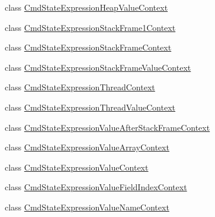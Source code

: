 \begin{DoxyCompactItemize}
\item 
class \hyperlink{classgov_1_1nasa_1_1jpf_1_1inspector_1_1server_1_1expression_1_1parser_1_1_expression_grammar_pa975e8909fcf76b653e93728b8bf729a1}{Cmd\+State\+Expression\+Heap\+Value\+Context}
\item 
class \hyperlink{classgov_1_1nasa_1_1jpf_1_1inspector_1_1server_1_1expression_1_1parser_1_1_expression_grammar_pabec1adacda521b9e6ed9ea64caf537b4}{Cmd\+State\+Expression\+Stack\+Frame1\+Context}
\item 
class \hyperlink{classgov_1_1nasa_1_1jpf_1_1inspector_1_1server_1_1expression_1_1parser_1_1_expression_grammar_pa1661807291671005dea18d81e1943036}{Cmd\+State\+Expression\+Stack\+Frame\+Context}
\item 
class \hyperlink{classgov_1_1nasa_1_1jpf_1_1inspector_1_1server_1_1expression_1_1parser_1_1_expression_grammar_pa27eac9bb10e329b6f1427633e5ce16ca}{Cmd\+State\+Expression\+Stack\+Frame\+Value\+Context}
\item 
class \hyperlink{classgov_1_1nasa_1_1jpf_1_1inspector_1_1server_1_1expression_1_1parser_1_1_expression_grammar_paf34f6c6cf6d3cef851c12971caa03ed5}{Cmd\+State\+Expression\+Thread\+Context}
\item 
class \hyperlink{classgov_1_1nasa_1_1jpf_1_1inspector_1_1server_1_1expression_1_1parser_1_1_expression_grammar_pa5a19a4a13564890289bc65b6a0372f78}{Cmd\+State\+Expression\+Thread\+Value\+Context}
\item 
class \hyperlink{classgov_1_1nasa_1_1jpf_1_1inspector_1_1server_1_1expression_1_1parser_1_1_expression_grammar_pa89116a9ed8dad2a185081bb1175595f7}{Cmd\+State\+Expression\+Value\+After\+Stack\+Frame\+Context}
\item 
class \hyperlink{classgov_1_1nasa_1_1jpf_1_1inspector_1_1server_1_1expression_1_1parser_1_1_expression_grammar_pa4110664045d2bee8d9164488bf2614d4}{Cmd\+State\+Expression\+Value\+Array\+Context}
\item 
class \hyperlink{classgov_1_1nasa_1_1jpf_1_1inspector_1_1server_1_1expression_1_1parser_1_1_expression_grammar_pa17ff9e538e96e94398ba5af02b5ffa30}{Cmd\+State\+Expression\+Value\+Context}
\item 
class \hyperlink{classgov_1_1nasa_1_1jpf_1_1inspector_1_1server_1_1expression_1_1parser_1_1_expression_grammar_pa31d705710a4d9acddfdd67c37ac04c8a}{Cmd\+State\+Expression\+Value\+Field\+Index\+Context}
\item 
class \hyperlink{classgov_1_1nasa_1_1jpf_1_1inspector_1_1server_1_1expression_1_1parser_1_1_expression_grammar_pa79fe925a020ecc7299d05e3047f2cfe9}{Cmd\+State\+Expression\+Value\+Name\+Context}

\end{DoxyCompactItemize}
